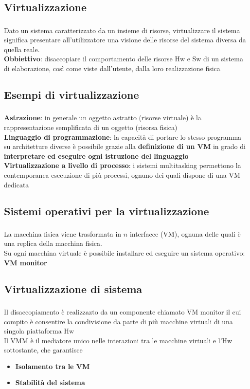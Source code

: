 \documentclass{beamer}
\newenvironment{mainframe}{
	\begin{frame}
		\frametitle{\insertsubsection}
		\framesubtitle{\insertsection}
	}{
	\end{frame}
}
\begin{document}
\subsection{Virtualizzazione}
\begin{mainframe}
	Dato un sistema caratterizzato da un insieme di risorse, virtualizzare il sistema significa presentare all'utilizzatore una visione delle risorse del sistema diversa da quella reale.\\
	\textbf{Obbiettivo}: disaccopiare il comportamento delle risorse Hw e Sw di un sistema di elaborazione, così come viste dall'utente, dalla loro realizzazione fisica
\end{mainframe}
\subsection{Esempi di virtualizzazione}
\begin{mainframe}
	\textbf{Astrazione}: in generale un oggetto astratto (risorse virtuale) è la rappresentazione semplificata di un oggetto (risorsa fisica)\\
	\textbf{Linguaggio di programmazione}: la capacità di portare lo stesso programma su architetture diverse è possibile grazie alla \textbf{definizione di un VM} in grado di \textbf{interpretare ed eseguire ogni istruzione del linguaggio}\\
	\textbf{Virtualizzazione a livello di processo}: i sistemi multitasking permettono la contemporanea esecuzione di più processi, ognuno dei quali dispone di una VM dedicata
\end{mainframe}
\subsection{Sistemi operativi per la virtualizzazione}
\begin{mainframe}
	La macchina fisica viene trasformata in $n$ interfacce (VM), ognuna delle quali è una replica della macchina fisica.\\
	Su ogni macchina virtuale è possibile installare ed eseguire un sistema operativo: \textbf{VM monitor}
\end{mainframe}
\subsection{Virtualizzazione di sistema}
\begin{mainframe}
	Il disaccopiamento è realizzazto da un componente chiamato VM monitor il cui compito è consentire la condivisione da parte di più macchine virtuali di una singola piattaforma Hw\\
	Il VMM è il mediatore unico nelle interazioni tra le macchine virtuali e l'Hw sottostante, che garantisce
	\begin{itemize}
		\item \textbf{Isolamento tra le VM}
		\item \textbf{Stabilità del sistema}
	\end{itemize}
\end{mainframe}
\end{document}
